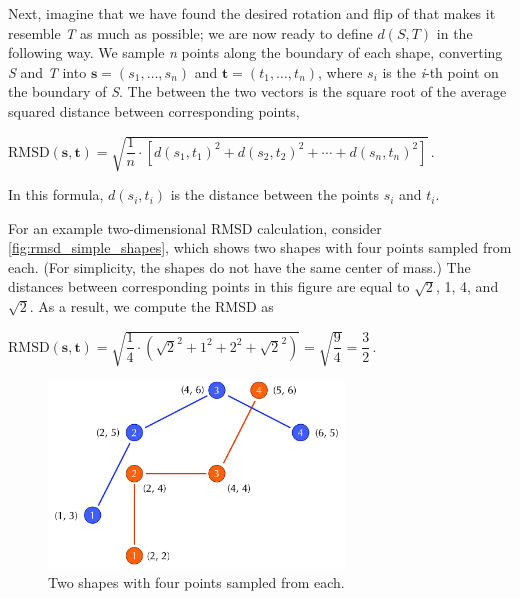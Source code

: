 Next, imagine that we have found the desired rotation and flip of  that makes it resemble \textit{T} as much as possible; we are now ready to define $d(S, T)$ in the following way. We sample \textit{n} points along the boundary of each shape, converting \textit{S} and \textit{T} into  $\mathbf{s} = (s_{1}, \ldots, s_{n})$ and $\mathbf{t} = (t_{1}, \ldots, t_{n})$, where $s_{i}$ is the \textit{i}-th point on the boundary of \textit{S}. The  between the two vectors is the square root of the average squared distance between corresponding points,

\begin{center}
$\text{RMSD}(\mathbf{s}, \mathbf{t}) = \sqrt{\dfrac{1}{n} \cdot \left[d(s_1, t_1)^2 + d(s_2, t_2)^2 + \cdots + d(s_n, t_n)^2\right]}$\,.
\end{center}

\noindent In this formula, $d(s_{i}, t_{i})$ is the distance between the points $s_{i}$ and $t_{i}$.\\

\begin{note}\end{note}

For an example two-dimensional RMSD calculation, consider \autoref{fig:rmsd_simple_shapes}, which shows two shapes with four points sampled from each. (For simplicity, the shapes do not have the same center of mass.) The distances between corresponding points in this figure are equal to $\sqrt{2}$, 1, 4, and $\sqrt{2}$. As a result, we compute the RMSD as

\begin{center}
$\text{RMSD}(\mathbf{s}, \mathbf{t}) = \sqrt{\dfrac{1}{4} \cdot (\sqrt{2}^2 + 1^2 + 2^2 + \sqrt{2}^2)} = \sqrt{\dfrac{9}{4}} = \dfrac{3}{2}\,.$
\end{center}

\begin{figure}[h]
	\centering
	\mySfFamily
	\includegraphics[width = 0.7\textwidth]{../images_CMYK/rmsd_simple_shapes}
	\caption{Two shapes with four points sampled from each.}
	\label{fig:rmsd_simple_shapes}
\end{figure}

